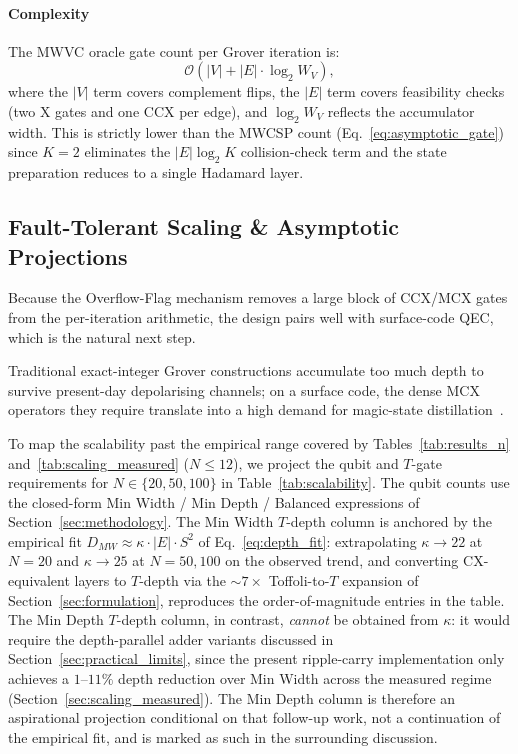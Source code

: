 \documentclass{ieeeaccess}
\begin{document}
\paragraph{Complexity}

The MWVC oracle gate count per Grover iteration is:
%
\begin{equation}
  \mathcal{O}\!\left(|V| + |E| \cdot \log_2 W_V\right),
\end{equation}
%
where the $|V|$ term covers complement flips, the $|E|$ term
covers feasibility checks (two X gates and one CCX per edge),
and $\log_2 W_V$ reflects the accumulator width. This is
strictly lower than the MWCSP count (Eq.~\eqref{eq:asymptotic_gate})
since $K=2$ eliminates the $|E| \log_2 K$ collision-check term
and the state preparation reduces to a single Hadamard layer.

\subsection{Fault-Tolerant Scaling \& Asymptotic Projections}
Because the Overflow-Flag mechanism removes a large block of CCX/MCX gates from the per-iteration arithmetic, the design pairs well with surface-code QEC, which is the natural next step.

Traditional exact-integer Grover constructions accumulate too much depth to survive present-day depolarising channels; on a surface code, the dense MCX operators they require translate into a high demand for magic-state distillation~\cite{preskill2018}. 

To map the scalability past the empirical range covered by Tables~\ref{tab:results_n} and~\ref{tab:scaling_measured} ($N \le 12$), we project the qubit and $T$-gate requirements for $N \in \{20, 50, 100\}$ in Table~\ref{tab:scalability}. The qubit counts use the closed-form Min Width / Min Depth / Balanced expressions of Section~\ref{sec:methodology}. The Min Width $T$-depth column is anchored by the empirical fit $D_{MW} \approx \kappa \cdot |E| \cdot S^2$ of Eq.~\eqref{eq:depth_fit}: extrapolating $\kappa \to 22$ at $N=20$ and $\kappa \to 25$ at $N=50, 100$ on the observed trend, and converting CX-equivalent layers to $T$-depth via the $\sim 7\times$ Toffoli-to-$T$ expansion of Section~\ref{sec:formulation}, reproduces the order-of-magnitude entries in the table. The Min Depth $T$-depth column, in contrast, \emph{cannot} be obtained from $\kappa$: it would require the depth-parallel adder variants discussed in Section~\ref{sec:practical_limits}, since the present ripple-carry implementation only achieves a $1$--$11\%$ depth reduction over Min Width across the measured regime (Section~\ref{sec:scaling_measured}). The Min Depth column is therefore an aspirational projection conditional on that follow-up work, not a continuation of the empirical fit, and is marked as such in the surrounding discussion.
\end{document}
